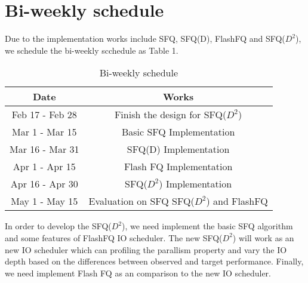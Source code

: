 \section{Bi-weekly schedule}

Due to the implementation works include SFQ, SFQ(D), FlashFQ and SFQ($D^2$), we schedule the bi-weekly scchedule as Table 1.\\
\begin{table}[t]
	\centering
	\tabcolsep=0.11cm
	\begin{tabular}{|c|c|}
		\hline
		Date & Works  \\
		\hline
		Feb 17 - Feb 28 & Finish the design for SFQ($D^2$) \\
		\hline
		Mar 1 - Mar 15 & Basic SFQ Implementation \\
		\hline
		Mar 16 - Mar 31 & SFQ(D) Implementation \\
		\hline
		Apr 1 - Apr 15  & Flash FQ Implementation \\
		\hline
		Apr 16 - Apr 30  & SFQ($D^2$) Implementation \\
		\hline
		May 1 - May 15  & Evaluation on SFQ SFQ($D^2$) and FlashFQ\\
		\hline
	\end{tabular}
	\caption{Bi-weekly schedule}
	\vspace{-12pt}
	\label{table:traces}
\end{table}

In order to develop the SFQ($D^2$), we need implement the basic SFQ algorithm and some features of FlashFQ IO scheduler. The new SFQ($D^2$) will work as an new IO scheduler which can profiling the parallism property and vary the IO depth based on the differences between observed and target performance. Finally, we need implement Flash FQ as an comparison to the new IO scheduler.